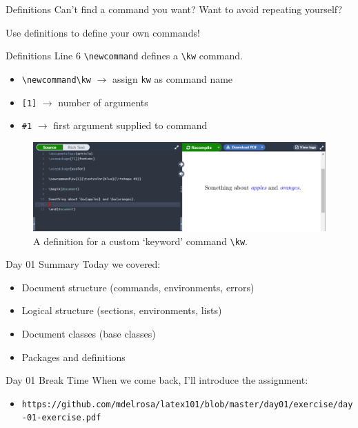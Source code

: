 \documentclass{beamer}
\begin{document}
{  \begin{frame}{Definitions}
    Can't find a command you want? Want to avoid repeating yourself? 

    Use definitions to define your own commands!
  \end{frame}

  \begin{frame}{Definitions}
    Line 6 \texttt{\textbackslash newcommand} defines a \texttt{\textbackslash kw} command.
    \begin{itemize}
      \item \texttt{\textbackslash newcommand\textbackslash kw} $\to$ assign \texttt{kw} as command name
      \item \texttt{[1]} $\to$ number of arguments
      \item \texttt{\#1} $\to$ first argument supplied to command
    \end{itemize}
    \begin{figure}
      \includegraphics[width=0.9\linewidth]{day01-overleaf-09A-defn.png}
      \caption{A definition for a custom `keyword' command \texttt{\textbackslash kw}.}
      \label{fig:day01-overleaf-09A}
    \end{figure}
  \end{frame}

  \begin{frame}{Day 01 Summary}
    Today we covered:
    \begin{itemize}
      \item Document structure (commands, environments, errors)
      \item Logical structure (sections, environments, lists)
      \item Document classes (base classes)
      \item Packages and definitions
    \end{itemize}
  \end{frame}

  \begin{frame}{Day 01 Break Time}
    When we come back, I'll introduce the assignment:
    \begin{itemize}
      \item \texttt{https://github.com/mdelrosa/latex101/blob/master/day01/exercise/day-01-exercise.pdf}
    \end{itemize}
  \end{frame}

}
\end{document}
